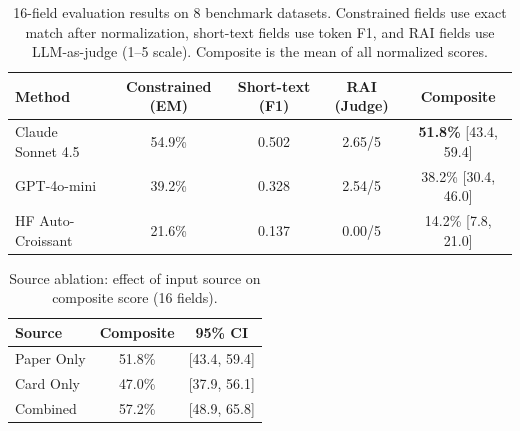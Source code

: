 \begin{table}[t]
\centering
\caption{16-field evaluation results on 8 benchmark datasets. Constrained fields use exact match after normalization, short-text fields use token F1, and RAI fields use LLM-as-judge (1--5 scale). Composite is the mean of all normalized scores.}
\label{tab:main-results}
\begin{tabular}{lcccc}
\toprule
Method & Constrained (EM) & Short-text (F1) & RAI (Judge) & Composite \\
\midrule
Claude Sonnet 4.5 & 54.9\% & 0.502 & 2.65/5 & \textbf{51.8\%} [43.4, 59.4] \\
GPT-4o-mini & 39.2\% & 0.328 & 2.54/5 & 38.2\% [30.4, 46.0] \\
HF Auto-Croissant & 21.6\% & 0.137 & 0.00/5 & 14.2\% [7.8, 21.0] \\
\bottomrule
\end{tabular}
\end{table}

\begin{table}[t]
\centering
\caption{Source ablation: effect of input source on composite score (16 fields).}
\label{tab:source-ablation}
\begin{tabular}{lcc}
\toprule
Source & Composite & 95\% CI \\
\midrule
Paper Only & 51.8\% & [43.4, 59.4] \\
Card Only & 47.0\% & [37.9, 56.1] \\
Combined & 57.2\% & [48.9, 65.8] \\
\bottomrule
\end{tabular}
\end{table}